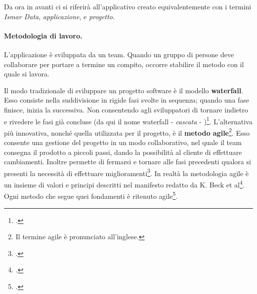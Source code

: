 \documentclass[./main.tex]{subfiles}
\begin{document}
Da ora in avanti ci si riferirà all'applicativo creato equivalentemente con i termini \textit{Ismar Data}, \textit{applicazione}, e \textit{progetto}.

\paragraph{Metodologia di lavoro.} L'applicazione è sviluppata da un team. Quando un gruppo di persone deve collaborare per portare a termine un compito, occorre stabilire il metodo con il quale si lavora.\par

Il modo tradizionale di sviluppare un progetto software è il modello \textbf{waterfall}. Esso consiste nella suddivisione in rigide fasi svolte in sequenza; quando una fase finisce, inizia la successiva. Non consentendo agli sviluppatori di tornare indietro e rivedere le fasi già concluse (da qui il nome waterfall - \textit{cascata} - )\footcite[131]{CONRAD2011129}. L'alternativa più innovativa, nonché quella utilizzata per il progetto, è il \textbf{metodo agile}\footnote{Il termine agile è pronunciato all'inglese.}. Esso consente una gestione del progetto in un modo collaborativo, nel quale il team consegna il prodotto a piccoli passi, dando la possibilità al cliente di effettuare cambiamenti. Inoltre permette di fermarsi e tornare alle fasi precedenti qualora si presenti la necessità di effettuare miglioramenti\footcite[7]{waters2012all}. In realtà la metodologia agile è un insieme di valori e principi descritti nel manifesto redatto da K. Beck et al\footcite{beck2001manifesto}. Ogni metodo che segue quei fondamenti è ritenuto agile\footcite[10]{waters2012all}.
\end{document}
